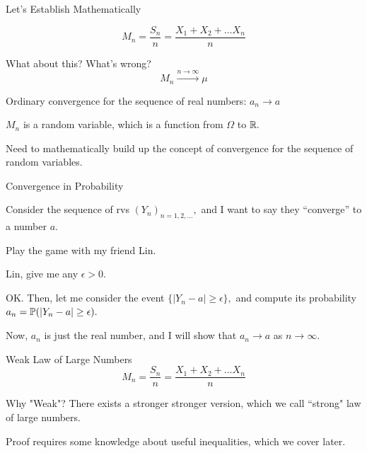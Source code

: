 \documentclass[fleqn,aspectratio=169]{beamer}
\begin{document}
\begin{frame}{Let's Establish Mathematically}

$$
M_n = \frac{S_n}{n} = \frac{X_1 + X_2+ \ldots X_n}{n}
$$

\plitemsep 0.1in
\bci 
\item<2-> What about this? What's wrong?
$$
M_n \xrightarrow{n \rightarrow \infty} \mu
$$

\item<3-> Ordinary convergence for the sequence of real numbers: $a_n \rightarrow a$



\item<5-> $M_n$ is a random variable, which is a function from $\Omega$ to ${\mathbb R}.$

\item<6-> Need to mathematically build up the concept of convergence for the sequence of random variables.

\eci 

\end{frame}

\begin{frame}{Convergence in Probability}

\plitemsep 0.1in

\bci 
\item<1-> Consider the sequence of rvs $(Y_n)_{n=1, 2, \ldots},$ and I want to say they ``converge'' to a number $a.$

\item<2-> Play the game with my friend Lin. 
\bci
\item<3-> Lin, give me any $\epsilon>0.$ 
\item<4-> OK. Then, let me consider the event $\{|Y_n -a| \geq \epsilon \},$ and compute its probability $a_n = \mathbb{P}( |Y_n -a| \geq \epsilon ).$
\item<5-> Now, $a_n$ is just the real number, and I will show that $a_n \rightarrow a$ as $n \rightarrow \infty.$

\eci
\eci 
\end{frame}

\begin{frame}{Weak Law of Large Numbers}
$$
M_n = \frac{S_n}{n} = \frac{X_1 + X_2+ \ldots X_n}{n}
$$

 \plitemsep 0.1in
 \bci 
 \item<3-> Why "Weak"? There exists a stronger stronger version, which we call ``strong" law of large numbers.

\item<4-> Proof requires some knowledge about useful inequalities, which we cover later. 
 \eci 
\end{frame}
\end{document}
